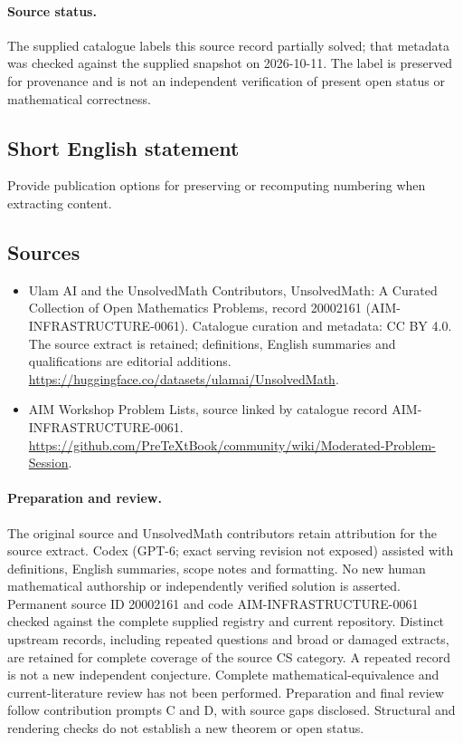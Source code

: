 \documentclass[11pt]{article}
\begin{document}
\paragraph{Source status.}
The supplied catalogue labels this source record partially solved; that metadata was checked against the supplied snapshot on 2026-10-11. The label is preserved for provenance and is not an independent verification of present open status or mathematical correctness.
\subsection{Short English statement}
Provide publication options for preserving or recomputing numbering when extracting content.
\subsection{Sources}
\begin{itemize}
\item[\hypertarget{source:20002161:1}{S1}] Ulam AI and the UnsolvedMath Contributors, UnsolvedMath: A Curated Collection of Open Mathematics Problems, record 20002161 (AIM-INFRASTRUCTURE-0061). Catalogue curation and metadata: CC BY 4.0. The source extract is retained; definitions, English summaries and qualifications are editorial additions.
\url{https://huggingface.co/datasets/ulamai/UnsolvedMath}.
\item[\hypertarget{source:20002161:2}{S2}] AIM Workshop Problem Lists, source linked by catalogue record AIM-INFRASTRUCTURE-0061.
\url{https://github.com/PreTeXtBook/community/wiki/Moderated-Problem-Session}.
\end{itemize}
\paragraph{Preparation and review.}
The original source and UnsolvedMath contributors retain attribution for the source extract. Codex (GPT-6; exact serving revision not exposed) assisted with definitions, English summaries, scope notes and formatting. No new human mathematical authorship or independently verified solution is asserted. Permanent source ID 20002161 and code AIM-INFRASTRUCTURE-0061 checked against the complete supplied registry and current repository. Distinct upstream records, including repeated questions and broad or damaged extracts, are retained for complete coverage of the source CS category. A repeated record is not a new independent conjecture. Complete mathematical-equivalence and current-literature review has not been performed. Preparation and final review follow contribution prompts C and D, with source gaps disclosed. Structural and rendering checks do not establish a new theorem or open status.
\label{end:20002161}
\end{document}
